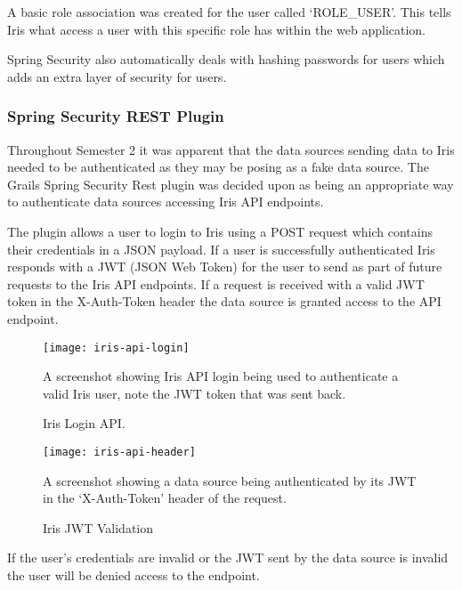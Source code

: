 \documentclass[12pt,a4paper,titlepage]{report}
\begin{document}
A basic role association was created for the user called `ROLE\_USER'. This tells Iris what access a user with this specific role has within the web application.

Spring Security also automatically deals with hashing passwords for users which adds an extra layer of security for users.
\subsubsection{Spring Security REST Plugin}
Throughout Semester 2 it was apparent that the data sources sending data to Iris needed to be authenticated as they may be posing as a fake data source. The Grails Spring Security Rest plugin was decided upon as being an appropriate way to authenticate data sources accessing Iris API endpoints.

The plugin allows a user to login to Iris using a POST request which contains their credentials in a JSON payload. If a user is successfully authenticated Iris responds with a JWT (JSON Web Token) for the user to send as part of future requests to the Iris API endpoints. If a request is received with a valid JWT token in the X-Auth-Token header the data source is granted access to the API endpoint.


\begin{figure}[H]
\begin{tcolorbox}
\begin{center}
\texttt{[image: iris-api-login]}
\end{center}
A screenshot showing Iris API login being used to authenticate a valid Iris user, note the JWT token that was sent back.
\end{tcolorbox}
\caption{Iris Login API.}
\end{figure}

\begin{figure}[H]
\begin{tcolorbox}
\begin{center}
\texttt{[image: iris-api-header]}
\end{center}
A screenshot showing a data source being authenticated by its JWT in the `X-Auth-Token' header of the request.
\end{tcolorbox}
\caption{Iris JWT Validation}
\end{figure}

If the user's credentials are invalid or the JWT sent by the data source is invalid the user will be denied access to the endpoint.
\end{document}
